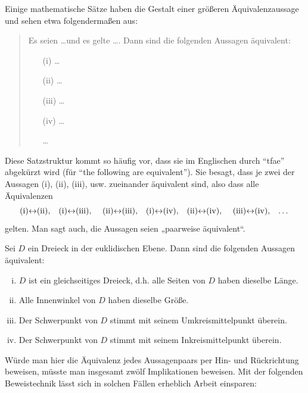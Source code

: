 \begin{defin} \label{def:tfae}
    Einige mathematische Sätze haben die Gestalt einer größeren Äquivalenzaussage und sehen etwa folgendermaßen aus:
    \begin{quote}
        Es seien \dots und es gelte \dots. Dann sind die folgenden Aussagen äquivalent:
        \begin{itemize}
            \item[(i)] \dots
            \item[(ii)] \dots
            \item[(iii)] \dots
            \item[(iv)] \dots
            \item[\dots]
        \end{itemize}
    \end{quote}
    Diese Satzstruktur kommt so häufig vor, dass sie im Englischen durch ``tfae'' abgekürzt wird (für ``the following are equivalent''). Sie besagt, dass je zwei der Aussagen (i), (ii), (iii), usw. zueinander äquivalent sind, also dass alle Äquivalenzen
        \[ \text{(i)$\leftrightarrow$(ii),\quad (i)$\leftrightarrow$(iii), \quad (ii)$\leftrightarrow$(iii),\quad (i)$\leftrightarrow$(iv),\quad (ii)$\leftrightarrow$(iv), \quad (iii)$\leftrightarrow$(iv),\quad \dots} \]
    gelten. Man sagt auch, die Aussagen seien „paarweise äquivalent“.
 \end{defin}
 
 
\begin{bsp}
    Sei $D$ ein Dreieck in der euklidischen Ebene. Dann sind die folgenden Aussagen äquivalent:
    \begin{enumerate}[(i)]
        \item $D$ ist ein gleichseitiges Dreieck, d.h. alle Seiten von $D$ haben dieselbe Länge.
        \item Alle Innenwinkel von $D$ haben dieselbe Größe.
        \item Der Schwerpunkt von $D$ stimmt mit seinem Umkreismittelpunkt überein.
        \item Der Schwerpunkt von $D$ stimmt mit seinem Inkreismittelpunkt überein.
    \end{enumerate}
Würde man hier die Äquivalenz jedes Aussagenpaars per Hin- und Rückrichtung beweisen, müsste man insgesamt zwölf Implikationen beweisen. Mit der folgenden Beweistechnik lässt sich in solchen Fällen erheblich Arbeit einsparen:
\end{bsp}


